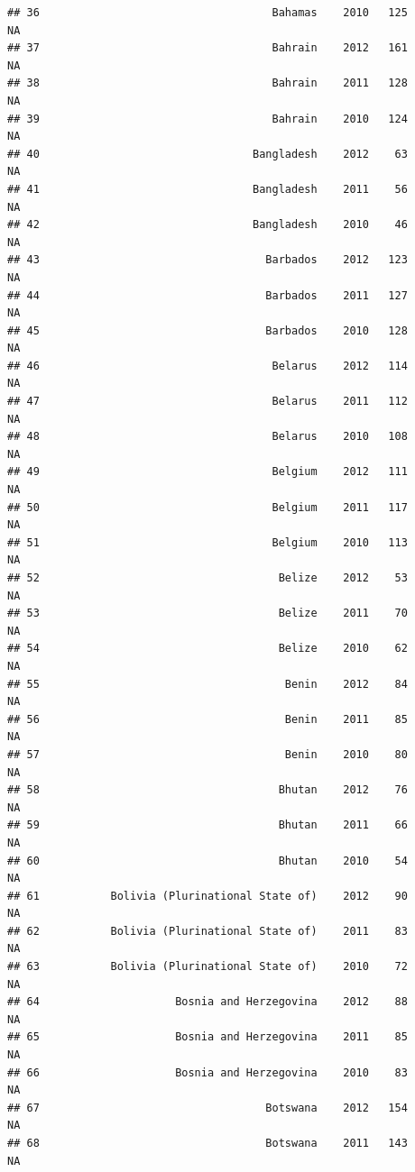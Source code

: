 \documentclass[
]{book}
\begin{document}
\begin{verbatim}
## 36                                    Bahamas    2010   125              NA
## 37                                    Bahrain    2012   161              NA
## 38                                    Bahrain    2011   128              NA
## 39                                    Bahrain    2010   124              NA
## 40                                 Bangladesh    2012    63              NA
## 41                                 Bangladesh    2011    56              NA
## 42                                 Bangladesh    2010    46              NA
## 43                                   Barbados    2012   123              NA
## 44                                   Barbados    2011   127              NA
## 45                                   Barbados    2010   128              NA
## 46                                    Belarus    2012   114              NA
## 47                                    Belarus    2011   112              NA
## 48                                    Belarus    2010   108              NA
## 49                                    Belgium    2012   111              NA
## 50                                    Belgium    2011   117              NA
## 51                                    Belgium    2010   113              NA
## 52                                     Belize    2012    53              NA
## 53                                     Belize    2011    70              NA
## 54                                     Belize    2010    62              NA
## 55                                      Benin    2012    84              NA
## 56                                      Benin    2011    85              NA
## 57                                      Benin    2010    80              NA
## 58                                     Bhutan    2012    76              NA
## 59                                     Bhutan    2011    66              NA
## 60                                     Bhutan    2010    54              NA
## 61           Bolivia (Plurinational State of)    2012    90              NA
## 62           Bolivia (Plurinational State of)    2011    83              NA
## 63           Bolivia (Plurinational State of)    2010    72              NA
## 64                     Bosnia and Herzegovina    2012    88              NA
## 65                     Bosnia and Herzegovina    2011    85              NA
## 66                     Bosnia and Herzegovina    2010    83              NA
## 67                                   Botswana    2012   154              NA
## 68                                   Botswana    2011   143              NA

\end{verbatim}
\end{document}
